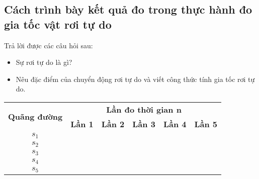 \subsection{Cách trình bày kết quả đo trong thực hành đo gia tốc vật rơi tự do}
Trả lời được các câu hỏi sau:
\begin{itemize}
	\item Sự rơi tự do là gì?
	\item Nêu đặc điểm của chuyển động rơi tự do và viết công thức tính gia tốc rơi tự do.
\end{itemize}
\begin{table}[h]
	\centering
	\begin{tabular}{|c|lllll|}
		\hline
		\multirow{2}{*}{\textbf{Quãng đường}} & \multicolumn{5}{c|}{\textbf{Lần đo thời gian n}}                                                                                                                                            \\ \cline{2-6} 
		& \multicolumn{1}{c|}{\textbf{Lần 1}} & \multicolumn{1}{c|}{\textbf{Lần 2}} & \multicolumn{1}{c|}{\textbf{Lần 3}} & \multicolumn{1}{c|}{\textbf{Lần 4}} & \multicolumn{1}{c|}{\textbf{Lần 5}} \\ \hline
		\textbf{$s_1$}                        & \multicolumn{1}{c|}{}               & \multicolumn{1}{c|}{}               & \multicolumn{1}{c|}{}               & \multicolumn{1}{l|}{}               &                                     \\ \hline
		\textbf{$s_2$}                        & \multicolumn{1}{l|}{}               & \multicolumn{1}{l|}{}               & \multicolumn{1}{l|}{}               & \multicolumn{1}{l|}{}               &                                     \\ \hline
		\textbf{$s_3$}                        & \multicolumn{1}{l|}{}               & \multicolumn{1}{l|}{}               & \multicolumn{1}{l|}{}               & \multicolumn{1}{l|}{}               &                                     \\ \hline
		\textbf{$s_4$}                        & \multicolumn{1}{l|}{}               & \multicolumn{1}{l|}{}               & \multicolumn{1}{l|}{}               & \multicolumn{1}{l|}{}               &                                     \\ \hline
		\textbf{$s_5$}                        & \multicolumn{1}{l|}{}               & \multicolumn{1}{l|}{}               & \multicolumn{1}{l|}{}               & \multicolumn{1}{l|}{}               &                                     \\ \hline
	\end{tabular}
\end{table}


